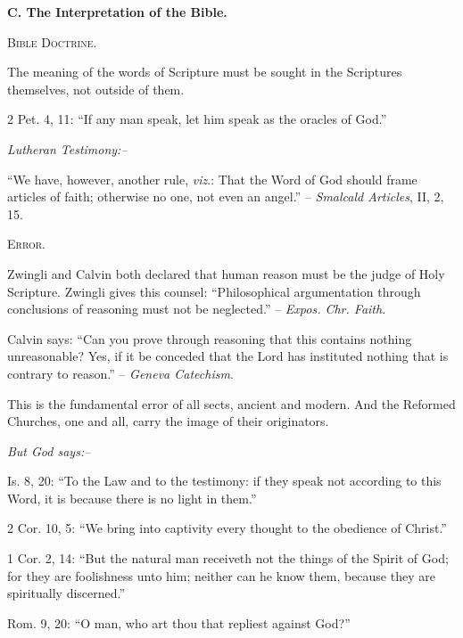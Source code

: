 \documentclass[
]{book}
\begin{document}
\begin{center}
\textbf{C.  The Interpretation of the Bible.}

\textsc{Bible Doctrine.}
\end{center}

The meaning of the words of Scripture must be sought in the Scriptures themselves, not outside of them.

2 Pet. 4, 11: ``If any man speak, let him speak as the oracles of God.''

\begin{center}
\textsl{Lutheran Testimony:--}
\end{center}

``We have, however, another rule, \emph{viz}.: That the Word of God should frame articles of faith; otherwise no one, not even an angel.'' -- \emph{Smalcald Articles}, II, 2, 15.

\begin{center}
\textsc{Error.}
\end{center}

Zwingli and Calvin both declared that human reason must be the judge of Holy Scripture. Zwingli gives this counsel: ``Philosophical argumentation through conclusions of reasoning must not be neglected.'' -- \emph{Expos. Chr. Faith}.

Calvin says: ``Can you prove through reasoning that this contains nothing unreasonable? Yes, if it be conceded that the Lord has instituted nothing that is contrary to reason.'' -- \emph{Geneva Catechism}.

This is the fundamental error of all sects, ancient and modern. And the Reformed Churches, one and all, carry the image of their originators.

\begin{center}
\textsl{But God says:--}
\end{center}

Is. 8, 20: ``To the Law and to the testimony: if they speak not according to this Word, it is because there is no light in them.''

2 Cor. 10, 5: ``We bring into captivity every thought to the obedience of Christ.''

1 Cor. 2, 14: ``But the natural man receiveth not the things of the Spirit of God; for they are foolishness unto him; neither can he know them, because they are spiritually discerned.''

Rom. 9, 20: ``O man, who art thou that repliest against God?''
\end{document}
